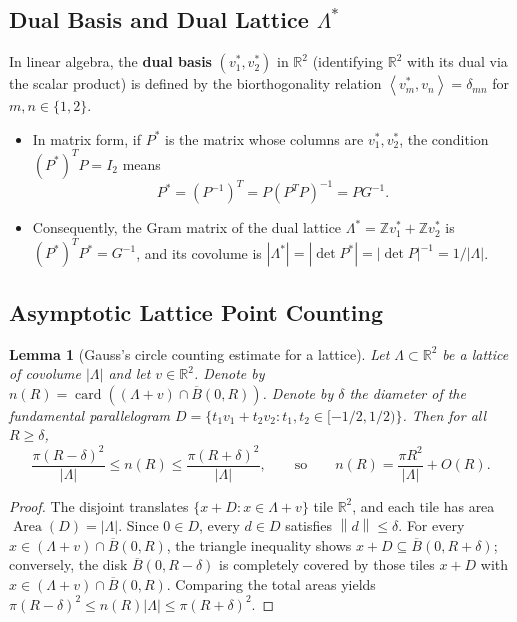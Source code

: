 \documentclass[11pt, a4paper]{article}
\newtheorem{lemma}[theorem]{Lemma}
\theoremstyle{definition}
\theoremstyle{remark}
\newcommand{\R}{\mathbb{R}}
\newcommand{\Z}{\mathbb{Z}}
\newcommand{\Bbar}{\overline{B}}
\newcommand{\norm}[1]{\left\lVert #1 \right\rVert}
\newcommand{\abs}[1]{\left\lvert #1 \right\rvert}
\newcommand{\inner}[2]{\left\langle #1, #2 \right\rangle}
\begin{document}
\subsection{Dual Basis and Dual Lattice $\Lambda^*$}
In linear algebra, the \textbf{dual basis} $(v_1^*, v_2^*)$ in $\R^2$ (identifying $\R^2$ with its dual via the scalar product) is defined by the biorthogonality relation $\inner{v_m^*}{v_n} = \delta_{mn}$ for $m, n \in \{1, 2\}$.
\begin{itemize}
    \item In matrix form, if $P^*$ is the matrix whose columns are $v_1^*, v_2^*$, the condition $(P^*)^T P = I_2$ means
    \[
    P^* = \left(P^{-1}\right)^T = P \left(P^T P\right)^{-1} = P G^{-1}.
    \]
    \item Consequently, the Gram matrix of the dual lattice $\Lambda^* = \Z v_1^* + \Z v_2^*$ is $(P^*)^T P^* = G^{-1}$, and its covolume is $\abs{\Lambda^*} = \abs{\det P^*} = \abs{\det P}^{-1} = 1/\abs{\Lambda}$.
\end{itemize}

\subsection{Asymptotic Lattice Point Counting}
\begin{lemma}[Gauss's circle counting estimate for a lattice]
\label{lem:lattice_count}
Let $\Lambda \subset \R^2$ be a lattice of covolume $\abs{\Lambda}$ and let $v \in \R^2$. Denote by $n(R) = \operatorname{card}((\Lambda + v) \cap \Bbar(0, R))$. Denote by $\delta$ the diameter of the fundamental parallelogram $D = \{t_1 v_1 + t_2 v_2 : t_1, t_2 \in [-1/2, 1/2)\}$. Then for all $R \ge \delta$,
\[
\frac{\pi (R - \delta)^2}{\abs{\Lambda}} \le n(R) \le \frac{\pi (R + \delta)^2}{\abs{\Lambda}}, \qquad \text{so} \qquad n(R) = \frac{\pi R^2}{\abs{\Lambda}} + O(R).
\]
\end{lemma}
\begin{proof}
The disjoint translates $\{x + D : x \in \Lambda + v\}$ tile $\R^2$, and each tile has area $\operatorname{Area}(D) = \abs{\Lambda}$. Since $0 \in D$, every $d \in D$ satisfies $\norm{d} \le \delta$. For every $x \in (\Lambda + v) \cap \Bbar(0, R)$, the triangle inequality shows $x + D \subseteq \Bbar(0, R + \delta)$; conversely, the disk $\Bbar(0, R - \delta)$ is completely covered by those tiles $x + D$ with $x \in (\Lambda + v) \cap \Bbar(0, R)$. Comparing the total areas yields $\pi(R - \delta)^2 \le n(R) \abs{\Lambda} \le \pi(R + \delta)^2$.
\end{proof}
\end{document}
